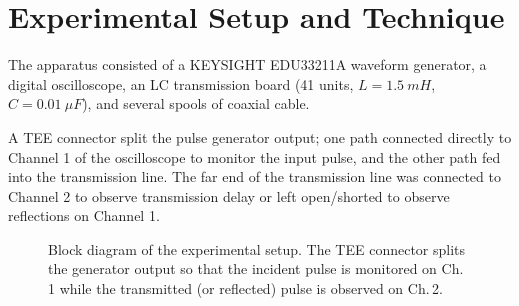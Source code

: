 \documentclass[11pt, letterpaper]{article}
\begin{document}
\section{Experimental Setup and Technique}
The apparatus consisted of a KEYSIGHT EDU33211A waveform generator, a digital oscilloscope, an LC transmission board (41 units, $L = \qty{1.5}{mH}$, $C = \qty{0.01}{\mu F}$), and several spools of coaxial cable.

A TEE connector split the pulse generator output; one path connected directly to Channel 1 of the oscilloscope to monitor the input pulse, and the other path fed into the transmission line. The far end of the transmission line was connected to Channel 2 to observe transmission delay or left open/shorted to observe reflections on Channel 1.

\begin{figure}[H]
\centering
{}
\caption{Block diagram of the experimental setup. The TEE connector splits the generator output so that the incident pulse is monitored on Ch.\,1 while the transmitted (or reflected) pulse is observed on Ch.\,2.}
\end{figure}
\end{document}
